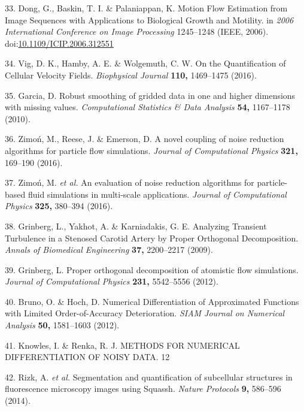 \documentclass{Dissertate}
\begin{document}
\leavevmode\hypertarget{ref-dong_motion_2006}{}%
33. Dong, G., Baskin, T. I. \& Palaniappan, K. Motion Flow Estimation
from Image Sequences with Applications to Biological Growth and
Motility. in \emph{2006 International Conference on Image Processing}
1245--1248 (IEEE, 2006).
doi:\href{https://doi.org/10.1109/ICIP.2006.312551}{10.1109/ICIP.2006.312551}

\leavevmode\hypertarget{ref-vig_quantification_2016}{}%
34. Vig, D. K., Hamby, A. E. \& Wolgemuth, C. W. On the Quantification
of Cellular Velocity Fields. \emph{Biophysical Journal} \textbf{110,}
1469--1475 (2016).

\leavevmode\hypertarget{ref-garcia_robust_2010}{}%
35. Garcia, D. Robust smoothing of gridded data in one and higher
dimensions with missing values. \emph{Computational Statistics \& Data
Analysis} \textbf{54,} 1167--1178 (2010).

\leavevmode\hypertarget{ref-zimon_novel_2016}{}%
36. Zimoń, M., Reese, J. \& Emerson, D. A novel coupling of noise
reduction algorithms for particle flow simulations. \emph{Journal of
Computational Physics} \textbf{321,} 169--190 (2016).

\leavevmode\hypertarget{ref-zimon_evaluation_2016}{}%
37. Zimoń, M. \emph{et al.} An evaluation of noise reduction algorithms
for particle-based fluid simulations in multi-scale applications.
\emph{Journal of Computational Physics} \textbf{325,} 380--394 (2016).

\leavevmode\hypertarget{ref-grinberg_analyzing_2009}{}%
38. Grinberg, L., Yakhot, A. \& Karniadakis, G. E. Analyzing Transient
Turbulence in a Stenosed Carotid Artery by Proper Orthogonal
Decomposition. \emph{Annals of Biomedical Engineering} \textbf{37,}
2200--2217 (2009).

\leavevmode\hypertarget{ref-grinberg_proper_2012}{}%
39. Grinberg, L. Proper orthogonal decomposition of atomistic flow
simulations. \emph{Journal of Computational Physics} \textbf{231,}
5542--5556 (2012).

\leavevmode\hypertarget{ref-bruno_numerical_2012}{}%
40. Bruno, O. \& Hoch, D. Numerical Differentiation of Approximated
Functions with Limited Order-of-Accuracy Deterioration. \emph{SIAM
Journal on Numerical Analysis} \textbf{50,} 1581--1603 (2012).

\leavevmode\hypertarget{ref-knowles_methods_nodate}{}%
41. Knowles, I. \& Renka, R. J. METHODS FOR NUMERICAL DIFFERENTIATION OF
NOISY DATA. 12

\leavevmode\hypertarget{ref-rizk_segmentation_2014}{}%
42. Rizk, A. \emph{et al.} Segmentation and quantification of
subcellular structures in fluorescence microscopy images using Squassh.
\emph{Nature Protocols} \textbf{9,} 586--596 (2014).
\end{document}
